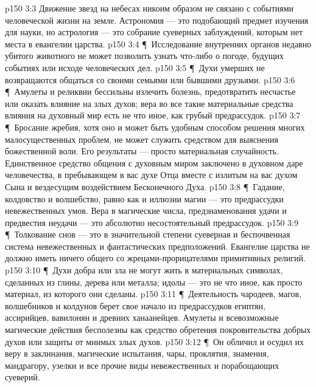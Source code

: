 \vs p150 3:3 \bibnobreakspace Движение звезд на небесах никоим образом не связано с событиями человеческой жизни на земле. Астрономия --- это подобающий предмет изучения для науки, но астрология --- это собрание суеверных заблуждений, которым нет места в евангелии царства.
\vs p150 3:4 \P\ \bibnobreakspace Исследование внутренних органов недавно убитого животного не может позволить узнать что\hyp{}либо о погоде, будущих событиях или исходе человеческих дел.
\vs p150 3:5 \P\ \bibnobreakspace Духи умерших не возвращаются общаться со своими семьями или бывшими друзьями.
\vs p150 3:6 \P\ \bibnobreakspace Амулеты и реликвии бессильны излечить болезнь, предотвратить несчастье или оказать влияние на злых духов; вера во все такие материальные средства влияния на духовный мир есть не что иное, как грубый предрассудок.
\vs p150 3:7 \P\ \bibnobreakspace Бросание жребия, хотя оно и может быть удобным способом решения многих малосущественных проблем, не может служить средством для выяснения божественной воли. Его результаты --- просто материальная случайность. Единственное средство общения с духовным миром заключено в духовном даре человечества, в пребывающем в вас духе Отца вместе с излитым на вас духом Сына и вездесущим воздействием Бесконечного Духа.
\vs p150 3:8 \P\ \bibnobreakspace Гадание, колдовство и волшебство, равно как и иллюзии магии --- это предрассудки невежественных умов. Вера в магические числа, предзнаменования удачи и предвестия неудачи --- это абсолютно несостоятельный предрассудок.
\vs p150 3:9 \P\ \bibnobreakspace Толкование снов --- это в значительной степени суеверная и беспочвенная система невежественных и фантастических предположений. Евангелие царства не должно иметь ничего общего со жрецами\hyp{}прорицателями примитивных религий.
\vs p150 3:10 \P\ \bibnobreakspace Духи добра или зла не могут жить в материальных символах, сделанных из глины, дерева или металла; идолы --- это не что иное, как просто материал, из которого они сделаны.
\vs p150 3:11 \P\ \bibnobreakspace Деятельность чародеев, магов, волшебников и колдунов берет свое начало из предрассудков египтян, ассирийцев, вавилонян и древних ханаанейцев. Амулеты и всевозможные магические действия бесполезны как средство обретения покровительства добрых духов или защиты от мнимых злых духов.
\vs p150 3:12 \P\ \bibnobreakspace Он обличил и осудил их веру в заклинания, магические испытания, чары, проклятия, знамения, мандрагору, узелки и все прочие виды невежественных и порабощающих суеверий.
